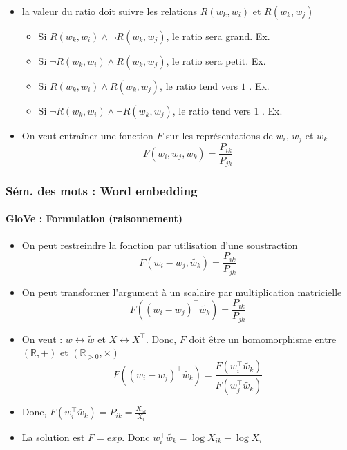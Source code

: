 \documentclass[xcolor=table]{beamer}
\begin{document}
\begin{frame}
\begin{itemize}
	\item la valeur du ratio doit suivre les relations $R(w_k, w_i)$ et $R(w_k, w_j)$
	\begin{itemize}
		\item Si $R(w_k, w_i) \wedge \neg R(w_k, w_j)$, le ratio sera grand. Ex. 
		\item Si $\neg R(w_k, w_i) \wedge R(w_k, w_j)$, le ratio sera petit. Ex. 
		\item Si $R(w_k, w_i) \wedge R(w_k, w_j)$, le ratio tend vers $1$ . Ex. 
		\item Si $\neg R(w_k, w_i) \wedge \neg R(w_k, w_j)$, le ratio tend vers $1$ . Ex. 
	\end{itemize}
	\item On veut entraîner une fonction $F$ sur les représentations de $w_i$, $w_j$ et $\tilde{w_k}$
	\vspace{-6pt}\[F(w_i, w_j, \tilde{w_k}) = \frac{P_{ik}}{P_{jk}}\]
\end{itemize}
	
\end{frame}

\begin{frame}
\frametitle{Sém. des mots : Word embedding}
\framesubtitle{GloVe : Formulation (raisonnement)}
	
\begin{itemize}
	\item On peut restreindre la fonction par utilisation d'une soustraction
	\vspace{-6pt}\[F(w_i - w_j, \tilde{w_k}) = \frac{P_{ik}}{P_{jk}}\]
	
	\item On peut transformer l'argument à un scalaire par multiplication matricielle
	\vspace{-6pt}\[F((w_i - w_j)^\top \tilde{w_k}) = \frac{P_{ik}}{P_{jk}}\]
	
	\item On veut : $w \leftrightarrow \tilde{w}$ et $X \leftrightarrow X^\top$. Donc, $F$ doit être un homomorphisme entre $(\mathbb{R}, +)$ et $(\mathbb{R}_{>0}, \times)$
	\vspace{-6pt}\[F((w_i - w_j)^\top \tilde{w_k}) = \frac{F(w_i^\top \tilde{w_k})}{F(w_j^\top \tilde{w_k})}\]
	
	\item Donc, $F(w_i^\top \tilde{w_k}) = P_{ik} = \frac{X_{ik}}{X_i}$
	
	\item La solution est $F = exp$. Donc $w_i^\top \tilde{w_k} = \log X_{ik} - \log X_i$
\end{itemize}
	
\end{frame}
\end{document}
